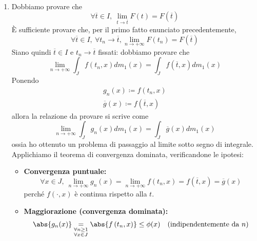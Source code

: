 \begin{demonstrationcaputwt}~
	\begin{enumerate}[label=\Roman*]
		\item Dobbiamo provare che
		\begin{equation*}
			\forall \overline{t}\in I,\ \lim_{t\to\overline{t}}F(t)=F\left(\overline{t}\right)
		\end{equation*}
		È sufficiente provare che, per il primo fatto enunciato precedentemente,
		\begin{equation*}
			\forall \overline{t}\in I,\ \forall t_n\to\overline{t}, \lim_{n\to+\infty}F\left(t_n\right)=F\left(\overline{t}\right)
		\end{equation*}
		Siano quindi $\overline{t}\in I$ e $t_n\to\overline{t}$ fissati: dobbiamo provare che
		\begin{equation*}
			\lim_{n\to+\infty}\int_Jf\left(t_n,x\right)dm_1(x)=\int_Jf\left(\overline{t},x\right)dm_1(x)
		\end{equation*}
		Ponendo
		\begin{align*}
			g_n(x)\coloneqq f\left(t_n,x\right)\\
			\overline{g}(x)\coloneqq f\left(\overline{t},x\right)
		\end{align*}
		allora la relazione da provare si scrive come
		\begin{equation*}
			\lim_{n\to+\infty}\int_Jg_n(x)dm_1(x)=\int_J\overline{g}(x)dm_1(x)
		\end{equation*}
		ossia ho ottenuto un problema di passaggio al limite sotto segno di integrale. Applichiamo il teorema di convergenza dominata, verificandone le ipotesi:
		\begin{itemize}
			\item \textbf{Convergenza puntuale:}
			\begin{equation*}
				\forall x\in J,\ \lim_{n\to+\infty}g_n(x)=\lim_{n\to+\infty}f\left(t_n,x\right)=f\left(\overline{t},x\right)=\overline{g}(x)
			\end{equation*}
			perché $f\left(\cdot,x\right)$ è continua rispetto alla $t$.
			\item \textbf{Maggiorazione (convergenza dominata):}
			\begin{equation*}
				\abs{g_n(x)}\underset{\substack{\forall n\geq 1\\\forall x\in J}}{=}\abs{f\left(t_n,x\right)}\leq \phi(x)\quad\text{(indipendentemente da $n$)}
			\end{equation*}
		\end{itemize}

\end{enumerate}
\end{demonstrationcaputwt}
